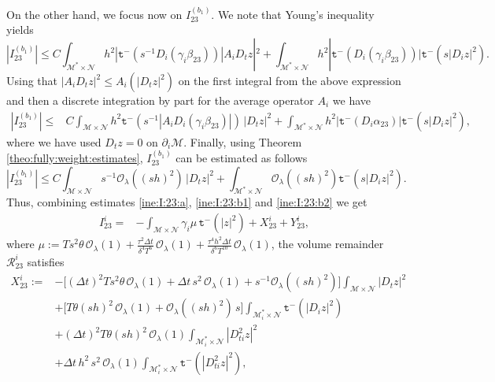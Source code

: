 \documentclass[11pt,oneside,leqno]{amsart}
\numberwithin{equation}{section}
\numberwithin{equation}{section}
\newcommand{\trm}{\mathtt t^-}
\begin{document}
\par On the other hand, we focus now on $I_{23}^{(b_{1})}$. We note that Young's inequality yields
\begin{equation}
    |I_{23}^{(b_{1})}|\leq C \int_{\mathcal{M}^{\ast}\times\mathcal{N}}h^{2}|\trm(s^{-1}D_{i}(\gamma_{i}\beta_{23}))|A_{i}D_{t}z|^{2}+\int_{\mathcal{M}^{\ast}\times\mathcal{N}}h^{2}|\trm(D_{i}(\gamma_{i}\beta_{23}))|\trm(s|D_{i}z|^{2}).
\end{equation}
Using that $|A_{i}D_{t}z|^{2}\leq A_{i}(|D_{t}z|^{2})$ on the first integral from the above expression and then a discrete integration by part for the average operator $A_{i}$ we have
\begin{equation}
\begin{split}
    |I_{23}^{(b_{1})}|\leq &C \int_{\mathcal{M}\times\mathcal{N}}h^{2}\trm(
    s^{-1}|A_{i}D_{i}(\gamma_{i}\beta_{23})|)\,|D_{t}z|^{2}+\int_{\mathcal{M}^{\ast}\times\mathcal{N}}h^{2}|\trm(D_{i}\alpha_{23})|\trm(s|D_{i}z|^{2}),
    \end{split}
\end{equation}
where we have used $D_{t}z=0$ on $\partial_{i}\mathcal{M}$. Finally, using Theorem \ref{theo:fully:weight:estimates}, $I_{23}^{(b_{1})}$ can be estimated as follows
\begin{equation}\label{ine:I:23:b1}
    |I_{23}^{(b_{1})}|\leq C \int_{\mathcal{M}\times\mathcal{N}}s^{-1}\mathcal{O}_{\lambda}((sh)^{2})\,|D_{t}z|^{2}+\int_{\mathcal{M}^{\ast}\times\mathcal{N}}\mathcal{O}_{\lambda}((sh)^{2})\trm(s|D_{i}z|^{2}).
\end{equation}
Thus, combining estimates \eqref{ine:I:23:a}, \eqref{ine:I:23:b1} and \eqref{ine:I:23:b2} we get
\begin{equation}\label{eq:I23:final}
\begin{aligned}
I_{23}^{i}=&-\int_{\mathcal{M}\times\mathcal{N}}\gamma_{i}\mu\,\trm(|z|^{2})+X_{23}^{i}+Y_{23}^{i},
\end{aligned}
\end{equation}
where $\mu:=Ts^{2}\theta\,\mathcal{O}_{\lambda}(1)+\frac{\tau^{2}\Delta t}{\delta^{4}T^{6}}\,\mathcal{O}_{\lambda}(1)+\frac{\tau^{4}h^{2}\Delta t}{\delta^{6}T^{10}}\,\mathcal{O}_{\lambda}(1)$, the volume remainder $\mathcal{R}_{23}^{i}$ satisfies
\begin{equation}\label{eq:R23}
\begin{aligned}
X_{23}^{i}:=&-\bigg[(\Delta t)^{2}Ts^{2}\theta\,\mathcal{O}_{\lambda}(1)+\Delta t\,s^{2}\,\mathcal{O}_{\lambda}(1)+s^{-1}\mathcal{O}_{\lambda}((sh)^{2})\bigg]\int_{\mathcal{M}\times\mathcal{N}}|D_{t}z|^{2}\\
&+\bigg[T\theta(sh)^{2}\,\mathcal{O}_{\lambda}(1)+\mathcal{O}_{\lambda}((sh)^{2})\,s\bigg]\int_{\mathcal{M}_{i}^{\ast}\times\mathcal{N}}\trm(|D_{i}z|^{2})\\
&+(\Delta t)^{2}T\theta(sh)^{2}\,\mathcal{O}_{\lambda}(1)\int_{\mathcal{M}_{i}^{\ast}\times\mathcal{N}}|D_{ti}^{2}z|^{2}\\
&+\Delta t\,h^{2}\,s^{2}\,\mathcal{O}_{\lambda}(1)\int_{\mathcal{M}_{i}^{\ast}\times\mathcal{N}}\trm(|D_{ti}^{2}z|^{2}),
\end{aligned}
\end{equation}
\end{document}
